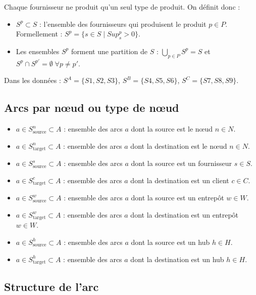 \documentclass{article}
\begin{document}
Chaque fournisseur ne produit qu'un seul type de produit. On définit donc :

\begin{itemize}
    \item $S^p \subset S$ : l'ensemble des fournisseurs qui produisent le produit $p \in P$.
    \quad Formellement : $S^p = \{ s \in S \mid Sup_s^p > 0 \}$.
    \item Les ensembles $S^p$ forment une partition de $S$ :
    $\displaystyle\bigcup_{p \in P} S^p = S$ \quad et \quad $S^p \cap S^{p'} = \emptyset \; \forall p \neq p'$.
\end{itemize}

\noindent Dans les données :
$S^A = \{S1, S2, S3\}$,\quad
$S^B = \{S4, S5, S6\}$,\quad
$S^C = \{S7, S8, S9\}$.

\subsection{Arcs par nœud ou type de nœud}

\begin{itemize}
    \item $a \in S_{\text{source}}^n \subset A$ : ensemble des arcs $a$ dont la source est le nœud $n \in N$.
    \item $a \in S_{\text{target}}^n \subset A$ : ensemble des arcs $a$ dont la destination est le nœud $n \in N$.
    \item $a \in S_{\text{source}}^s \subset A$ : ensemble des arcs $a$ dont la source est un fournisseur $s \in S$.
    \item $a \in S_{\text{target}}^c \subset A$ : ensemble des arcs $a$ dont la destination est un client $c \in C$.
    \item $a \in S_{\text{source}}^w \subset A$ : ensemble des arcs $a$ dont la source est un entrepôt $w \in W$.
    \item $a \in S_{\text{target}}^w \subset A$ : ensemble des arcs $a$ dont la destination est un entrepôt $w \in W$.
    \item $a \in S_{\text{source}}^h \subset A$ : ensemble des arcs $a$ dont la source est un hub $h \in H$.
    \item $a \in S_{\text{target}}^h \subset A$ : ensemble des arcs $a$ dont la destination est un hub $h \in H$.
\end{itemize}

\subsection{Structure de l'arc}
\end{document}
